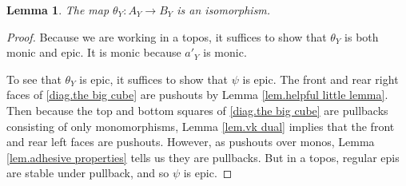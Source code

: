 \documentclass[11pt]{amsart}
\newcommand{\from}{\colon}
\newtheorem{lem}[thm]{Lemma}
\theoremstyle{remark}
\theoremstyle{definition}
\begin{document}
\begin{lem} 
	\label{lem.theta_Y iso}
	The map $\theta_Y \from A_Y \to B_Y$ is an isomorphism.
\end{lem}
%
\begin{proof}
	Because we are working in a topos, it suffices to show that $\theta_Y$ is both monic and epic. It is monic because $a'_Y$ is monic.
	
	To see that $\theta_Y$ is epic, it suffices to show that $\psi$ is epic. The front and rear right faces of \eqref{diag.the big cube} are pushouts by Lemma \ref{lem.helpful little lemma}.  Then because the top and bottom squares of \eqref{diag.the big cube} are pullbacks consisting of only monomorphisms, Lemma \ref{lem.vk dual} implies that the front and rear left faces are pushouts.  However, as pushouts over monos, Lemma \ref{lem.adhesive properties} tells us they are pullbacks.  But in a topos, regular epis are stable under pullback, and so $\psi$ is epic.  	
	\begin{comment}
	Observe the subdiagrams 
	\[
	\begin{tikzcd}[row sep=1em,column sep=1em]
	{A} 
		\ar[d,twoheadrightarrow]
		\ar[r,"a'"] & 
	{S'+T'} 
		\ar[r]
		\ar[d,twoheadrightarrow] & 
	{S+T} 
		\ar[d,twoheadrightarrow] \\
	{A_Y} 
		\ar[r,"a'_Y"] & 
	{S'+_YT'} 
		\ar[r] 
	& {S+_YT} 
	\end{tikzcd}
	\begin{tikzcd}[row sep=1em,column sep=1em]
	{A} 
		\ar[d,twoheadrightarrow]
		\ar[r,"a''"] & 
	{S''+T''} 
		\ar[r] 
		\ar[d,twoheadrightarrow] & 
	{S+T} 
		\ar[d,twoheadrightarrow] \\
	{A_Y} 
		\ar[r,"a''_Y"] & 
	{S''+_YT''} 
		\ar[r] & 
	{S+_YT} 
	\end{tikzcd}
	\]
	of \eqref{diag.the big cube}, each of whose outer and left squares are pushouts. As in Lemma \ref{lem.helpful little lemma}, the right squares are pushouts. Since the top and bottom squares in \eqref{diag.the big cube} are pullbacks consisting solely of monomorphisms, Lemma \ref{lem.vk dual} implies that the faces
	\begin{equation}
	\label{diag.showing epic}
	\begin{tikzcd}[row sep=1em,column sep=1em]
	{A} 
	\ar[r,rightarrowtail] 
	\ar[d,"\psi"] & 
	{S'+T'} 
	\ar[d,twoheadrightarrow] \\
	{B_Y} 
	\ar[r,rightarrowtail] & 
	{S'+_YT'} 
	\end{tikzcd}
	\begin{tikzcd}[row sep=1em,column sep=1em]
	{A} 
	\ar[r,rightarrowtail] 
	\ar[d,"\psi"] & 
	{S''+T''} 
	\ar[d,twoheadrightarrow] \\
	{B_Y} 
	\ar[r,rightarrowtail] & 
	{S''+_YT''} 
	\end{tikzcd}
	\end{equation}
	are pushouts.  However, as pushouts over 
	monos,
	Lemma \ref{lem.adhesive properties} tells 
	us 
	they are pullbacks. In a topos, regular 
	epis 
	are stable under pullback. Applying this 
	to 
	\eqref{diag.showing epic}, we conclude 
	that 
	$\psi$ is epic.
	\end{comment}
\end{proof}
%
%
%
%
%
%
\end{document}
